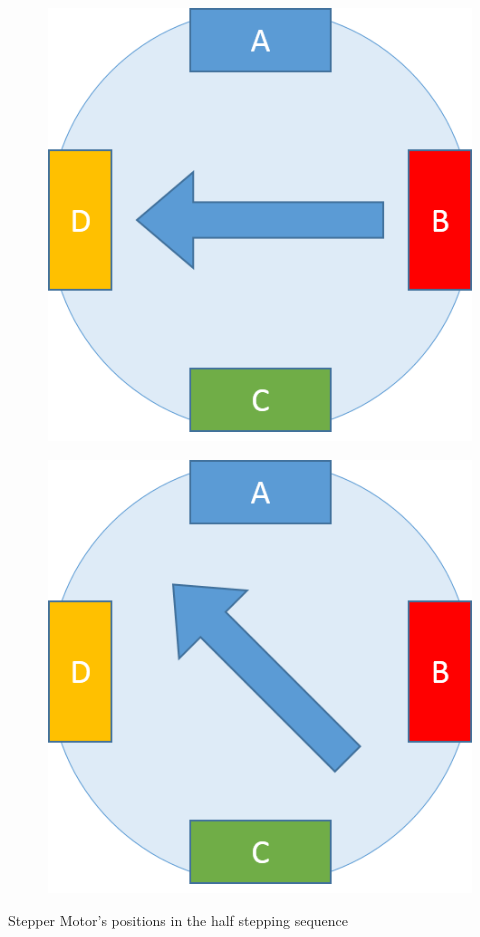 \documentclass[table,10pt,red]{beamer}	%
\begin{document}
\begin{frame}
\begin{minipage}[c]{0.24\textwidth}
\begin{figure}
		\end{figure}
	\end{minipage}
	\begin{minipage}[c]{0.24\textwidth}
		\begin{figure}
			\includegraphics[width=0.9\linewidth]{step7}
		\end{figure}
	\end{minipage}
	\begin{minipage}[c]{0.24\textwidth}
		\begin{figure}
			\includegraphics[width=0.9\linewidth]{step8}
		\end{figure}
	\end{minipage}
	
	\begin{center}
		Stepper Motor's positions in the half stepping sequence
	\end{center}

\end{frame}
\end{document}
